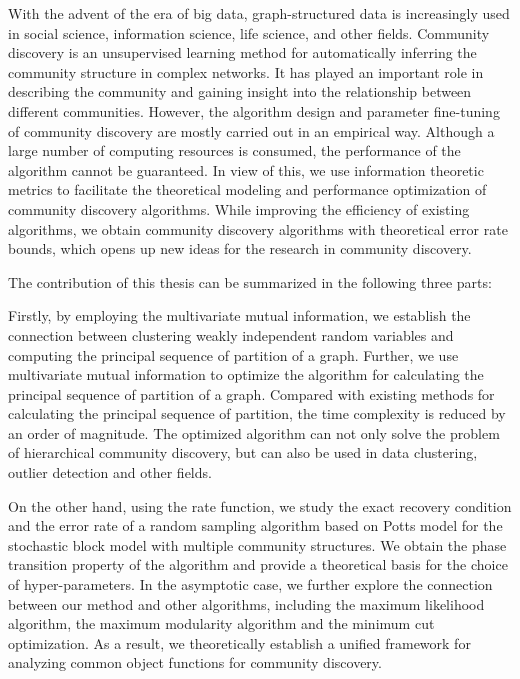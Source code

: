 \begin{abstract*}
  With the advent of the era of big data, graph-structured data is increasingly used in
  social science, information science, life science, and other fields.
  Community discovery is an unsupervised learning method for automatically inferring the community structure
  in complex networks.
  It has played an important role in describing the community and gaining insight into the relationship between different communities.
  However, the algorithm design and parameter fine-tuning of community discovery are mostly carried out in an empirical way.
  Although a large number of computing resources is consumed,
  the performance of the algorithm cannot be guaranteed.
  In view of this,
  we use information theoretic metrics
  to facilitate the theoretical modeling and performance optimization of community discovery algorithms.
  While improving the efficiency of existing algorithms,
  we obtain community discovery algorithms with theoretical error rate bounds,
  which opens up new ideas for the research in community discovery.

  The contribution of this thesis can be summarized in the following three parts:

  Firstly, by employing the multivariate mutual information,
  we establish the connection between clustering weakly independent random variables and computing the principal sequence of partition
  of a graph.
  Further, we use multivariate mutual information to optimize the algorithm for calculating the principal sequence of partition of a graph.
  Compared with existing methods for calculating the principal sequence of partition,
  the time complexity is reduced by an order of magnitude.
  The optimized algorithm can not only solve the problem of hierarchical community discovery, but can also be used in data clustering, outlier detection and other fields.

  On the other hand, using the rate function,
  we study the exact recovery condition and the error rate of a random sampling algorithm based on Potts model
  for the stochastic block model with multiple community structures.
  We obtain the phase transition property of the algorithm and provide a theoretical basis
  for the choice of hyper-parameters.
  In the asymptotic case, we further explore the connection between our method and other algorithms, including the maximum likelihood algorithm, the maximum modularity algorithm and the minimum cut optimization.
  As a result, we theoretically establish a unified framework for analyzing common object functions for community discovery.


\end{abstract*}
